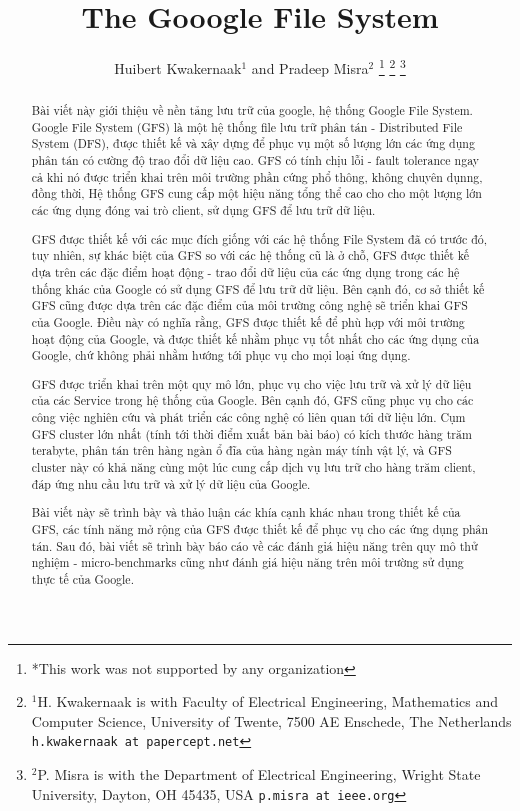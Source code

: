 \documentclass[a4paper, 10pt, conference]{IEEEconf}
\title{\LARGE \bf
The Gooogle File System
}
\author{Huibert Kwakernaak$^{1}$ and Pradeep Misra$^{2}$%
\thanks{*This work was not supported by any organization}%
\thanks{$^{1}$H. Kwakernaak is with Faculty of Electrical Engineering, Mathematics and Computer Science,
        University of Twente, 7500 AE Enschede, The Netherlands
        {\tt\small h.kwakernaak at papercept.net}}%
\thanks{$^{2}$P. Misra is with the Department of Electrical Engineering, Wright State University,
        Dayton, OH 45435, USA
        {\tt\small p.misra at ieee.org}}%
}
\begin{document}
\maketitle
\thispagestyle{empty}
\pagestyle{empty}


\begin{abstract}
Bài viết này giới thiệu về nền tảng lưu trữ của google, hệ thống Google File System. Google File System (GFS) là một hệ thống file lưu trữ phân tán - Distributed File System (DFS), được thiết kế và xây dựng để phục vụ một số lượng lớn các ứng dụng phân tán có cường độ trao đổi dữ liệu cao. GFS có tính chịu lỗi - fault tolerance ngay cả khi nó được triển khai trên môi trường phần cứng phổ thông, không chuyên dụnng, đồng thời, Hệ thống GFS cung cấp một hiệu năng tổng thể cao cho cho một lượng lớn các ứng dụng đóng vai trò client, sử dụng GFS để lưu trữ dữ liệu.

GFS được thiết kế với các mục đích giống với các hệ thống File System đã có trước đó, tuy nhiên, sự khác biệt của GFS so với các hệ thống cũ là ở chỗ, GFS được thiết kế dựa trên các đặc điểm hoạt động - trao đổi dữ liệu của các ứng dụng trong các hệ thống khác của Google có sử dụng GFS để lưu trữ dữ liệu. Bên cạnh đó, cơ sở thiết kế GFS cũng được dựa trên các đặc điểm của môi trường  công nghệ sẽ triển khai GFS của Google. Điều này có nghĩa rằng, GFS được thiết kế để phù hợp với môi trường hoạt động của Google, và được thiết kế nhằm phục vụ tốt nhất cho các ứng dụng của Google, chứ không phải nhằm hướng tới phục vụ cho mọi loại ứng dụng.

GFS được triển khai trên một quy mô lớn, phục vụ cho việc lưu trữ và xử lý dữ liệu của các Service trong hệ thống của Google. Bên cạnh đó, GFS cũng phục vụ cho các công việc nghiên cứu và phát triển các công nghệ có liên quan tới dữ liệu lớn. Cụm GFS cluster lớn nhất (tính tới thời điểm xuất bản bài báo) có kích thước hàng trăm terabyte, phân tán trên hàng ngàn ổ đĩa của hàng ngàn máy tính vật lý, và GFS cluster này có khả năng cùng một lúc cung cấp dịch vụ lưu trữ cho hàng trăm client, đáp ứng nhu cầu lưu trữ và xử lý dữ liệu của Google.

Bài viết này sẽ trình bày và thảo luận các khía cạnh khác nhau trong thiết kế của GFS, các tính năng mở rộng của GFS được thiết kế để phục vụ cho các ứng dụng phân tán. Sau đó, bài viết sẽ trình bày báo cáo về các đánh giá hiệu năng trên quy mô thử nghiệm - micro-benchmarks cũng như đánh giá hiệu năng trên môi trường sử dụng thực tế của Google.
\end{abstract}
\end{document}
